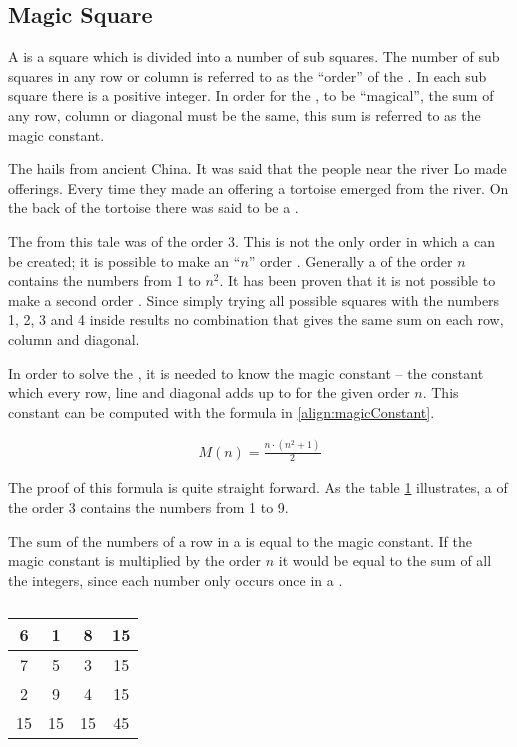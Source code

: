 \subsection{Magic Square}
\label{sec:magicSquare}
A \msquare{} is a square which is divided into a number of sub squares. The number of sub squares in any row or column is referred to as the ``order'' of the \msquare{}. In each sub square there is a positive integer. In order for the \msquare{}, to be ``magical'', the sum of any row, column or diagonal must be the same, this sum is referred to as the magic constant.

The \msquare{}\cite{aiden06} hails from ancient China. It was said that the people near the river Lo made offerings. Every time they made an offering a tortoise emerged from the river. On the back of the tortoise there was said to be a \msquare{}.

The \msquare{} from this tale was of the order 3. This is not the only order in which a \msquare{} can be created; it is possible to make an ``$n$'' order \msquare{}. Generally a \msquare{} of the order $n$ contains the numbers from 1 to $n^2$. It has been proven that it is not possible to make a second order \msquare{}. Since simply trying all possible squares with the numbers 1, 2, 3 and 4 inside results no combination that gives the same sum on each row, column and diagonal.

In order to solve the \msquare{}, it is needed to know the magic constant -- the constant which every row, line and diagonal adds up to for the given order $n$. This constant can be computed with the formula in \ref{align:magicConstant}.

\begin{align}
\label{align:magicConstant}
	M(n) = \frac{n \cdot (n^2+1)}{2}
\end{align}

The proof of this formula is quite straight forward. As the table \ref{tab:magicSquareOrder3} illustrates, a \msquare{} of the order 3 contains the numbers from 1 to 9.

The sum of the numbers of a row in a \msquare{} is equal to the magic constant. If the magic constant is multiplied by the order $n$ it would be equal to the sum of all the integers, since each number only occurs once in a \msquare{}.

\renewcommand{\arraystretch}{1.3}
\begin{table}[h]
	\centering
		\begin{tabular}{|c|c|c |@{\vrules}| c|}
			\hline
			6&1&8&15 \\
			\hline
			7&5&3&15 \\
			\hline
			2&9&4&15 \\
			\noalign{\hrules}
			15&15&15&45 \\
			\hline
		\end{tabular}
	\caption{}
	\label{tab:magicSquareOrder3}
\end{table}

